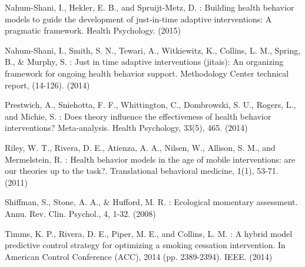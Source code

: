 \documentclass[runningheads,a4paper]{llncs}
\begin{document}
\begin{thebibliography}{4}
 Nahum-Shani, I., Hekler, E. B., and Spruijt-Metz, D. : Building health behavior models to guide the development of just-in-time adaptive interventions: A pragmatic framework. Health Psychology. (2015)

 Nahum-Shani, I., Smith, S. N., Tewari, A., Witkiewitz, K., Collins, L. M., Spring, B., & Murphy, S. : Just in time adaptive interventions (jitais): An organizing framework for ongoing health behavior support. Methodology Center technical report, (14-126). (2014)

 Prestwich, A., Sniehotta, F. F., Whittington, C., Dombrowski, S. U., Rogers, L., and Michie, S. : Does theory influence the effectiveness of health behavior interventions? Meta-analysis. Health Psychology, 33(5), 465. (2014)

 Riley, W. T., Rivera, D. E., Atienza, A. A., Nilsen, W., Allison, S. M., and Mermelstein, R. : Health behavior models in the age of mobile interventions: are our theories up to the task?. Translational behavioral medicine, 1(1), 53-71. (2011)

 Shiffman, S., Stone, A. A., & Hufford, M. R. : Ecological momentary assessment. Annu. Rev. Clin. Psychol., 4, 1-32. (2008)

 Timms, K. P., Rivera, D. E., Piper, M. E., and Collins, L. M. : A hybrid model predictive control strategy for optimizing a smoking cessation intervention. In American Control Conference (ACC), 2014 (pp. 2389-2394). IEEE. (2014)







\end{thebibliography}
\end{document}
